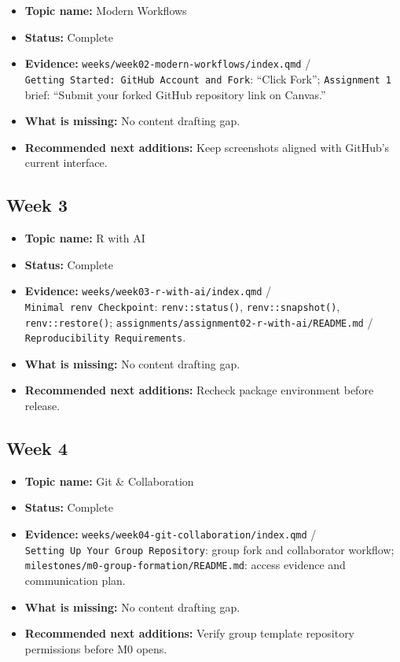\documentclass[
  letterpaper,
  DIV=11,
  numbers=noendperiod,
  oneside]{scrreprt}
\providecommand{\tightlist}{%
  \setlength{\itemsep}{0pt}\setlength{\parskip}{0pt}}
\begin{document}
\begin{itemize}
\tightlist
\item
  \textbf{Topic name:} Modern Workflows
\item
  \textbf{Status:} Complete
\item
  \textbf{Evidence:} \texttt{weeks/week02-modern-workflows/index.qmd} /
  \texttt{Getting\ Started:\ GitHub\ Account\ and\ Fork}: ``Click
  Fork''; \texttt{Assignment\ 1} brief: ``Submit your forked GitHub
  repository link on Canvas.''
\item
  \textbf{What is missing:} No content drafting gap.
\item
  \textbf{Recommended next additions:} Keep screenshots aligned with
  GitHub's current interface.
\end{itemize}

\subsection{Week 3}\label{week-3}

\begin{itemize}
\tightlist
\item
  \textbf{Topic name:} R with AI
\item
  \textbf{Status:} Complete
\item
  \textbf{Evidence:} \texttt{weeks/week03-r-with-ai/index.qmd} /
  \texttt{Minimal\ renv\ Checkpoint}: \texttt{renv::status()},
  \texttt{renv::snapshot()}, \texttt{renv::restore()};
  \texttt{assignments/assignment02-r-with-ai/README.md} /
  \texttt{Reproducibility\ Requirements}.
\item
  \textbf{What is missing:} No content drafting gap.
\item
  \textbf{Recommended next additions:} Recheck package environment
  before release.
\end{itemize}

\subsection{Week 4}\label{week-4}

\begin{itemize}
\tightlist
\item
  \textbf{Topic name:} Git \& Collaboration
\item
  \textbf{Status:} Complete
\item
  \textbf{Evidence:} \texttt{weeks/week04-git-collaboration/index.qmd} /
  \texttt{Setting\ Up\ Your\ Group\ Repository}: group fork and
  collaborator workflow;
  \texttt{milestones/m0-group-formation/README.md}: access evidence and
  communication plan.
\item
  \textbf{What is missing:} No content drafting gap.
\item
  \textbf{Recommended next additions:} Verify group template repository
  permissions before M0 opens.
\end{itemize}
\end{document}
